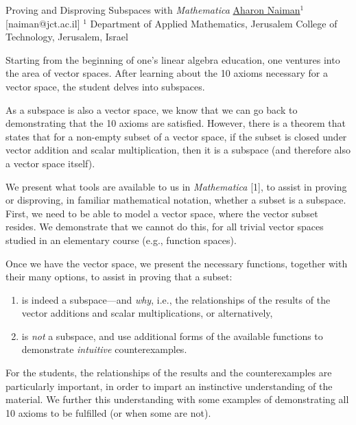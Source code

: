 


\begin{abstract_online}{Proving and Disproving Subspaces with \emph{Mathematica}}{%
        \underline{Aharon Naiman}$^{1}$}{[naiman@jct.ac.il]
        }{%
        $^1$ Department of Applied Mathematics, Jerusalem College of
    Technology, Jerusalem, Israel}

Starting from the beginning of one's linear algebra education, one
ventures into the area of vector spaces.  After learning about the 10
axioms necessary for a vector space, the student delves into
subspaces.

As a subspace is also a vector space, we know that we can go back to
demonstrating that the 10 axioms are satisfied.  However, there is a
theorem that states that for a non-empty subset of a vector space, if
the subset is closed under vector addition and scalar multiplication,
then it is a subspace (and therefore also a vector space itself).

We present what tools are available to us in \emph{Mathematica} [1],
to assist in proving or disproving, in familiar mathematical notation,
whether a subset is a subspace.  First, we need to be able to model a
vector space, where the vector subset resides.  We demonstrate that we
cannot do this, for all trivial vector spaces studied in an elementary
course (e.g., function spaces).

Once we have the vector space, we present the necessary functions,
together with their many options, to assist in proving that a subset:
%
\begin{enumerate}
    \item is indeed a subspace---and \emph{why}, i.e., the
          relationships of the results of the vector additions and
          scalar multiplications, or alternatively,
    \item is \emph{not} a subspace, and use additional forms of the
          available functions to demonstrate \emph{intuitive}
          counterexamples.
\end{enumerate}
%
For the students, the relationships of the results and the
counterexamples are particularly important, in order to impart an
instinctive understanding of the material.  We further this
understanding with some examples of demonstrating all 10 axioms to be
fulfilled (or when some are not).


\end{abstract_online}

